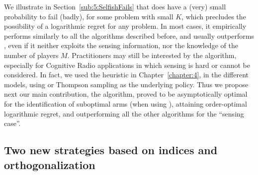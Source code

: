 We illustrate in Section~\ref{sub:5:SelfishFails} that \Selfish{} does have a (very) small probability to fail (badly), for some problem with small $K$,
which precludes the possibility of a logarithmic regret for any problem.
In most cases, it empirically performs similarly to all the algorithms described before,
and usually outperforms \rhoRand,
even if it neither exploits the sensing information, nor the knowledge of the number of players $M$.
%
Practitioners may still be interested by the algorithm, especially for Cognitive Radio applications in which sensing is hard or cannot be considered.
In fact, we used the \Selfish{} heuristic in Chapter~\ref{chapter:4}, in the different models, using \UCB{} or Thompson sampling as the underlying policy.
%
Thus we propose next our main contribution, the \MCTopM{} algorithm, proved to be asymptotically optimal for the identification of suboptimal arms (when using \klUCB), attaining order-optimal logarithmic regret, and outperforming all the other algorithms for the ``sensing case''.



\subsection{Two new strategies based on indices and orthogonalization}
\label{sub:5:RandTopM_and_MCTopM}




